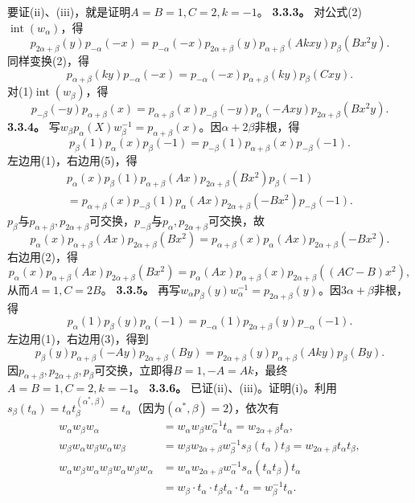 要证(ii)、(iii)，就是证明$A=B=1,C=2,k=-1$。
\textbf{3.3.3。} 对公式(2)$\operatorname{int}(w_\alpha)$，得
\[p_{2\alpha+\beta}(y)p_{-\alpha}(-x)=p_{-\alpha}(-x)p_{2\alpha+\beta}(y)p_{\alpha+\beta}(Akxy)p_\beta(Bx^2y).\tag{3}\]
同样变换(2)，得
\[p_{\alpha+\beta}(ky)p_{-\alpha}(-x)=p_{-\alpha}(-x)p_{\alpha+\beta}(ky)p_\beta(Cxy).\tag{4}\]
对(1)$\operatorname{int}(w_\beta)$，得
\[p_{-\beta}(-y)p_{\alpha+\beta}(x)=p_{\alpha+\beta}(x)p_{-\beta}(-y)p_\alpha(-Axy)p_{2\alpha+\beta}(Bx^2y).\tag{5}\]
\textbf{3.3.4。} 写$w_\beta p_\alpha(X)w_\beta^{-1}=p_{\alpha+\beta}(x)$。因$\alpha+2\beta$非根，得
\[p_\beta(1)p_\alpha(x)p_\beta(-1)=p_{-\beta}(1)p_{\alpha+\beta}(x)p_{-\beta}(-1).\]
左边用(1)，右边用(5)，得
\[\begin{aligned}p_\alpha(x)p_\beta(1)p_{\alpha+\beta}(Ax)p_{2\alpha+\beta}(Bx^2)p_\beta(-1)\\=p_{\alpha+\beta}(x)p_{-\beta}(1)p_\alpha(Ax)p_{2\alpha+\beta}(-Bx^2)p_{-\beta}(-1).\end{aligned}\]
$p_\beta$与$p_{\alpha+\beta},p_{2\alpha+\beta}$可交换，$p_{-\beta}$与$p_\alpha,p_{2\alpha+\beta}$可交换，故
\[p_\alpha(x)p_{\alpha+\beta}(Ax)p_{2\alpha+\beta}(Bx^2)=p_{\alpha+\beta}(x)p_\alpha(Ax)p_{2\alpha+\beta}(-Bx^2).\]
右边用(2)，得
\[p_\alpha(x)p_{\alpha+\beta}(Ax)p_{2\alpha+\beta}(Bx^2)=p_\alpha(Ax)p_{\alpha+\beta}(x)p_{2\alpha+\beta}((AC-B)x^2),\]
从而$A=1,C=2B$。
\textbf{3.3.5。} 再写$w_\alpha p_\beta(y)w_\alpha^{-1}=p_{2\alpha+\beta}(y)$。因$3\alpha+\beta$非根，得
\[p_\alpha(1)p_\beta(y)p_\alpha(-1)=p_{-\alpha}(1)p_{2\alpha+\beta}(y)p_{-\alpha}(-1).\]
左边用(1)，右边用(3)，得到
\[p_\beta(y)p_{\alpha+\beta}(-Ay)p_{2\alpha+\beta}(By)=p_{2\alpha+\beta}(y)p_{\alpha+\beta}(Aky)p_\beta(By).\]
因$p_{\alpha+\beta},p_{2\alpha+\beta},p_\beta$可交换，立即得$B=1,-A=Ak$，最终$A=B=1,C=2,k=-1$。
\textbf{3.3.6。} 已证(ii)、(iii)。证明(i)。利用$s_\beta(t_\alpha)=t_\alpha t_\beta^{(\alpha^*,\beta)}=t_\alpha$（因为$(\alpha^*,\beta)=2$），依次有
\[\begin{aligned}w_\alpha w_\beta w_\alpha&=w_\alpha w_\beta w_\alpha^{-1}t_\alpha=w_{2\alpha+\beta}t_\alpha,\\w_\beta w_\alpha w_\beta w_\alpha w_\beta&=w_\beta w_{2\alpha+\beta}w_\beta^{-1}s_\beta(t_\alpha)t_\beta=w_{2\alpha+\beta}t_\alpha t_\beta,\\w_\alpha w_\beta w_\alpha w_\beta w_\alpha w_\beta w_\alpha&=w_\alpha w_{2\alpha+\beta}w_\alpha^{-1}s_\alpha(t_\alpha t_\beta)t_\alpha\\&=w_\beta\cdot t_\alpha\cdot t_\beta t_\alpha\cdot t_\alpha=w_\beta^{-1}t_\alpha.\end{aligned}\]
